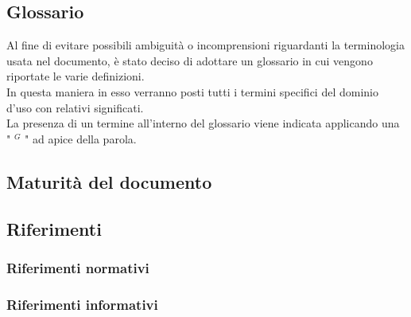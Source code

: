     \subsection{Glossario}

    Al fine di evitare possibili ambiguità o incomprensioni riguardanti la terminologia usata nel documento, è stato deciso di adottare un glossario in cui vengono riportate le varie definizioni.  \\
    In questa maniera in esso verranno posti tutti i termini specifici del dominio d’uso con relativi significati. \\
    La presenza di un termine all’interno del glossario viene indicata applicando una " $^{G}$ " ad apice della parola.


    \subsection{Maturità del documento}

    \subsection{Riferimenti}

        \subsubsection{Riferimenti normativi}

        \subsubsection{Riferimenti informativi}
